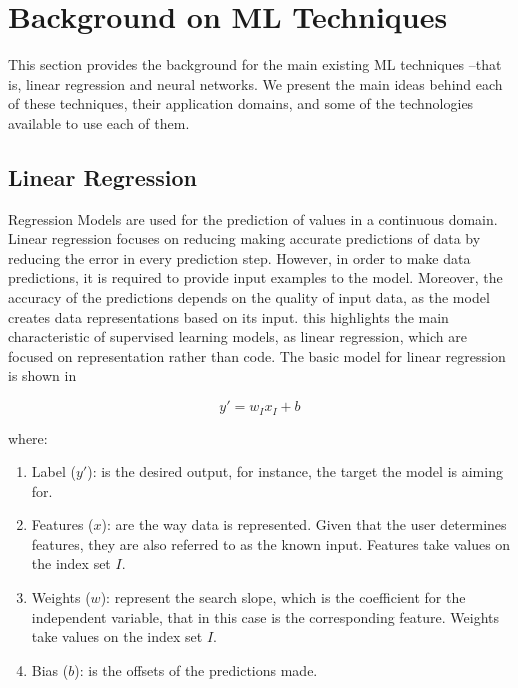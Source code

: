 

\section{Background on \acl{ML} Techniques}
\label{sec:related}

This section provides the background for the main existing \ac{ML} techniques --that is, linear 
regression and neural networks. We present the main ideas behind each of these techniques, their 
application domains, and some of the technologies available to use each of them. 

\subsection{Linear Regression}

Regression Models are used for the prediction of values in a continuous domain. Linear regression 
focuses on reducing making accurate predictions of data by reducing the error in every prediction 
step. However, in order to make data predictions, it is required to provide input examples to the 
model. Moreover, the accuracy of the predictions depends on the quality of input data, as the model 
creates data representations based on its input. this highlights the main characteristic of supervised 
learning models, as linear regression, which are focused on representation rather than code. The 
basic model for linear regression is shown in 

\begin{equation} \label{eq:linearReg}
y'=w_I x_I+b
\end{equation}

where:
\begin{enumerate}
 \item Label ($y'$): is the desired output, for instance, the target the model is aiming for.
 \item Features ($x$):  are the way data is represented. Given that the user determines features, they are also referred to as the known input. Features take values on the index set $I$. 
 \item Weights ($w$): represent the search slope, which is the coefficient for the independent variable, that in this case is the corresponding feature.  Weights take values on the index set $I$. 
 \item Bias ($b$): is the offsets of the predictions made. 
\end{enumerate}

